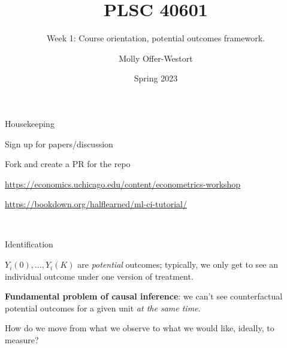 \documentclass[xcolor={dvipsnames}, handout]{beamer}
\title{PLSC 40601}
\subtitle{Week 1: Course orientation, potential outcomes framework.}
\date{Spring 2023}
\author{Molly Offer-Westort}
\institute{Department of Political Science, \\University of Chicago}
\begin{document}


\frame{\titlepage
\thispagestyle{empty}
}
\begin{frame}{Housekeeping}

\pause
\begin{wideitemize}
\item Sign up for papers/discussion\pause
\item Fork and create a PR for the repo\pause
\item \url{https://economics.uchicago.edu/content/econometrics-workshop} \pause
\item \url{https://bookdown.org/halflearned/ml-ci-tutorial/}
\end{wideitemize}

\end{frame}



\begin{transitionframe}
\centering

\LARGE \textcolor{white}{Identification.}

\end{transitionframe}
\begin{frame}{Identification}

\begin{wideitemize}
\item $Y_i(0), \dots, Y_i(K)$ are \textit{potential} outcomes\pause; typically, we only get to see an individual outcome under one version of treatment. \pause
\item \textbf{Fundamental problem of causal inference}: we can't see counterfactual potential outcomes for a given unit \textit{at the same time}.\pause
\item How do we move from what we observe to what we would like, ideally, to measure? 
\end{wideitemize}

\end{frame}
\end{document}
